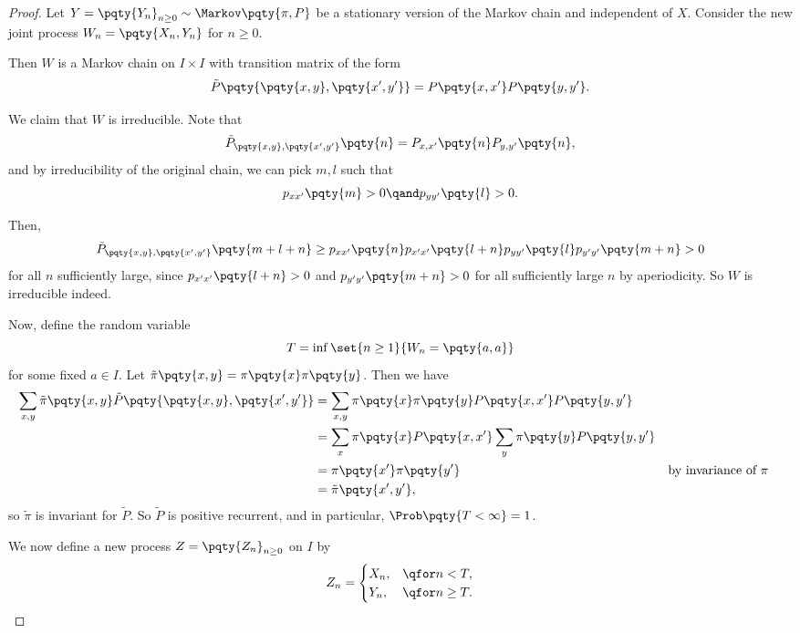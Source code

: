 \begin{proof}
    Let \(Y = \pqty{Y_n}_{n \geq 0} \sim \Markov\pqty{\pi, P}\) be a stationary version of the Markov chain and independent of \(X\). Consider the new joint process \(W_n = \pqty{X_n, Y_n}\) for \(n \geq 0\).

    Then \(W\) is a Markov chain on \(I \times I\) with transition matrix of the form
    \[
        \tilde{P} \pqty{\pqty{x, y}, \pqty{x', y'}} = P\pqty{x, x'} P\pqty{y, y'}.
    \]

    We claim that \(W\) is irreducible. Note that
    \[
        \tilde{P}_{\pqty{x, y}, \pqty{x', y'}} \pqty{n} = P_{x, x'} \pqty{n} P_{y, y'} \pqty{n},
    \]
    and by irreducibility of the original chain, we can pick \(m, l\) such that
    \[
        p_{x x'} \pqty{m} > 0 \qand p_{y y'} \pqty{l} > 0.
    \]

    Then,
    \[
        \tilde{P}_{\pqty{x, y}, \pqty{x', y'}} \pqty{m + l + n} \geq p_{x x'} 
        \pqty{n} p_{x' x'} \pqty{l + n} p_{y y'} \pqty{l} p_{y' y'} \pqty{m + n} > 0
    \]
    for all \(n\) sufficiently large, since \(p_{x' x'} \pqty{l + n} > 0\) and \(p_{y' y'} \pqty{m + n} > 0\) for all sufficiently large \(n\) by aperiodicity. So \(W\) is irreducible indeed.

    Now, define the random variable
    \[
        T = \inf \set{n \geq 1}{W_n = \pqty{a, a}}
    \]
    for some fixed \(a \in I\). Let \(\tilde{\pi} \pqty{x, y} = \pi\pqty{x} \pi\pqty{y}\). Then we have
    \begin{align*}
        \sum_{x, y} \tilde{\pi} \pqty{x, y} \tilde{P} \pqty{\pqty{x, y}, \pqty{x', y'}} &= \sum_{x, y} \pi\pqty{x} \pi\pqty{y} P\pqty{x, x'} P\pqty{y, y'} \\
        &= \sum_{x} \pi\pqty{x} P\pqty{x, x'} \sum_{y} \pi\pqty{y} P\pqty{y, y'} \\
        &= \pi\pqty{x'} \pi\pqty{y'} && \text{by invariance of }\pi \\
        &= \tilde{\pi} \pqty{x', y'},
    \end{align*}
    so \(\tilde{\pi}\) is invariant for \(\tilde{P}\). So \(\tilde{P}\) is positive recurrent, and in particular, \(\Prob\pqty{T < \infty} = 1\).

    We now define a new process \(Z = \pqty{Z_n}_{n \geq 0}\) on \(I\) by
    \[
        Z_n = \begin{cases}
            X_n, &\qfor n < T, \\
            Y_n, &\qfor n \geq T.
        \end{cases}
    \]


\end{proof}
